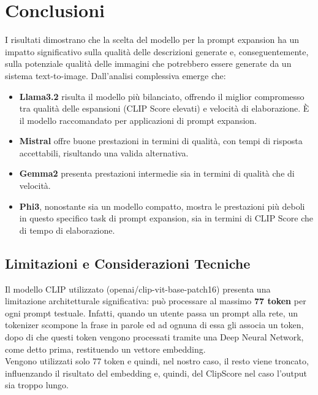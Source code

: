 \documentclass{article}
\begin{document}
\section{Conclusioni}
I risultati dimostrano che la scelta del modello per la prompt expansion ha un impatto significativo sulla qualità delle descrizioni generate e, conseguentemente, sulla potenziale qualità delle immagini che potrebbero essere generate da un sistema text-to-image.
Dall'analisi complessiva emerge che:
\begin{itemize}
    \item \textbf{Llama3.2} risulta il modello più bilanciato, offrendo il miglior compromesso tra qualità delle espansioni (CLIP Score elevati) e velocità di elaborazione. È il modello raccomandato per applicazioni di prompt expansion.
    \item \textbf{Mistral} offre buone prestazioni in termini di qualità, con tempi di risposta accettabili, risultando una valida alternativa.
    \item \textbf{Gemma2} presenta prestazioni intermedie sia in termini di qualità che di velocità.
    \item \textbf{Phi3}, nonostante sia un modello compatto, mostra le prestazioni più deboli in questo specifico task di prompt expansion, sia in termini di CLIP Score che di tempo di elaborazione.
\end{itemize}


\subsection{Limitazioni e Considerazioni Tecniche}

Il modello CLIP utilizzato (openai/clip-vit-base-patch16) presenta una limitazione architetturale significativa: può processare al massimo \textbf{77 token} per ogni prompt testuale.
Infatti, quando un utente passa un prompt alla rete, un tokenizer scompone la frase in parole ed ad ognuna di essa gli associa un token, dopo di che questi token vengono processati tramite una Deep Neural Network, come detto prima, restituendo un vettore embedding.\\
Vengono utilizzati solo 77 token e quindi, nel nostro caso, il resto viene troncato, influenzando il risultato del embedding e, quindi, del ClipScore nel caso l'output sia troppo lungo.
\end{document}
